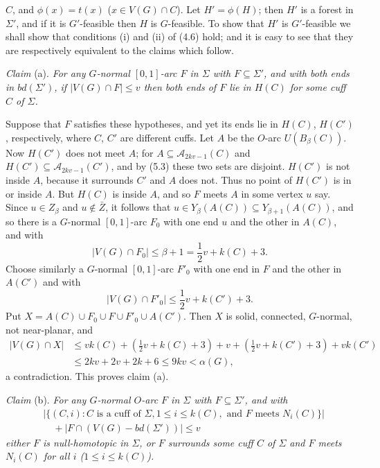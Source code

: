 \noindent $C$, and $\phi(x) = t(x)$ ($x \in V(G) \cap C$). Let $H' = \phi(H)$; then $H'$ is a forest in $\Sigma'$, and if it is $G'$-feasible then $H$ is $G$-feasible. To show that $H'$ is $G'$-feasible we shall show that conditions (i) and (ii) of (4.6) hold; and it is easy to see that they are respectively equivalent to the claims which follow.

\textit{Claim} (a). \textit{For any $G$-normal $[0, 1]$-arc $F$ in $\Sigma$ with $F \subseteq \Sigma'$, and with both ends in $bd(\Sigma')$, if $|V(G) \cap F| \le v$ then both ends of $F$ lie in $H(C)$ for some cuff $C$ of $\Sigma$.}

Suppose that $F$ satisfies these hypotheses, and yet its ends lie in $H(C)$, $H(C')$, respectively, where $C$, $C'$ are different cuffs. Let $A$ be the $O$-arc $U(B_\beta(C))$. Now $H(C')$ does not meet $A$; for $A \subseteq \mathcal{A}_{2kv-1}(C)$ and $H(C') \subseteq \mathcal{A}_{2kv-1}(C')$, and by (5.3) these two sets are disjoint. $H(C')$ is not inside $A$, because it surrounds $C'$ and $A$ does not. Thus no point of $H(C')$ is in or inside $A$. But $H(C)$ is inside $A$, and so $F$ meets $A$ in some vertex $u$ say. Since $u \in Z_\beta$ and $u \notin \bar{Z}$, it follows that $u \in Y_\beta(A(C)) \subseteq Y_{\beta+1}(A(C))$, and so there is a $G$-normal $[0, 1]$-arc $F_0$ with one end $u$ and the other in $A(C)$, and with
\begin{equation*}
|V(G) \cap F_0| \le \beta + 1 = \frac{1}{2}v + k(C) + 3.
\end{equation*}
Choose similarly a $G$-normal $[0, 1]$-arc $F'_0$ with one end in $F$ and the other in $A(C')$ and with
\begin{equation*}
|V(G) \cap F'_0| \le \frac{1}{2}v + k(C') + 3.
\end{equation*}
Put $X = A(C) \cup F_0 \cup F \cup F'_0 \cup A(C')$. Then $X$ is solid, connected, $G$-normal, not near-planar, and
\begin{align*}
|V(G) \cap X| &\le vk(C) + (\frac{1}{2}v + k(C) + 3) + v + (\frac{1}{2}v + k(C') + 3) + vk(C') \\
&\le 2kv + 2v + 2k + 6 \le 9kv < \alpha(G),
\end{align*}
a contradiction. This proves claim (a).

\textit{Claim} (b). \textit{For any $G$-normal $O$-arc $F$ in $\Sigma$ with $F \subseteq \Sigma'$, and with}
\begin{align*}
&|\{(C, i)\colon C \text{ is a cuff of } \Sigma, 1 \le i \le k(C), \text{ and } F \text{ meets } N_i(C)\}| \\
&\quad + |F \cap (V(G) - bd(\Sigma'))| \le v
\end{align*}
\textit{either $F$ is null-homotopic in $\Sigma$, or $F$ surrounds some cuff $C$ of $\Sigma$ and $F$ meets $N_i(C)$ for all $i$ ($1 \le i \le k(C)$).}

